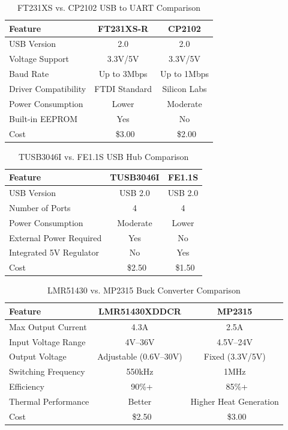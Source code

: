 \documentclass[12pt]{article}
\begin{document}
\begin{table}[H]
\centering
\begin{tabular}{|l|c|c|}
\hline
\textbf{Feature} & \textbf{FT231XS-R} & \textbf{CP2102} \\
\hline
USB Version & 2.0 & 2.0 \\
Voltage Support & 3.3V/5V & 3.3V/5V \\
Baud Rate & Up to 3Mbps & Up to 1Mbps \\
Driver Compatibility & FTDI Standard & Silicon Labs \\
Power Consumption & Lower & Moderate \\
Built-in EEPROM & Yes & No \\
Cost & ~\$3.00 & ~\$2.00 \\
\hline
\end{tabular}
\caption{FT231XS vs. CP2102 USB to UART Comparison}
\label{ft231_vs_cp2102}
\end{table}

\begin{table}[H]
\centering
\begin{tabular}{|l|c|c|}
\hline
\textbf{Feature} & \textbf{TUSB3046I} & \textbf{FE1.1S} \\
\hline
USB Version & USB 2.0 & USB 2.0 \\
Number of Ports & 4 & 4 \\
Power Consumption & Moderate & Lower \\
External Power Required & Yes & No \\
Integrated 5V Regulator & No & Yes \\
Cost & ~\$2.50 & ~\$1.50 \\
\hline
\end{tabular}
\caption{TUSB3046I vs. FE1.1S USB Hub Comparison}
\label{tusb_vs_fe1}
\end{table}

\begin{table}[H]
\centering
\begin{tabular}{|l|c|c|}
\hline
\textbf{Feature} & \textbf{LMR51430XDDCR} & \textbf{MP2315} \\
\hline
Max Output Current & 4.3A & 2.5A \\
Input Voltage Range & 4V–36V & 4.5V–24V \\
Output Voltage & Adjustable (0.6V–30V) & Fixed (3.3V/5V) \\
Switching Frequency & 550kHz & 1MHz \\
Efficiency & ~90\%+ & ~85\%+ \\
Thermal Performance & Better & Higher Heat Generation \\
Cost & ~\$2.50 & ~\$3.00 \\
\hline
\end{tabular}
\caption{LMR51430 vs. MP2315 Buck Converter Comparison}
\label{lm514_vs_mp2315}
\end{table}
\end{document}
